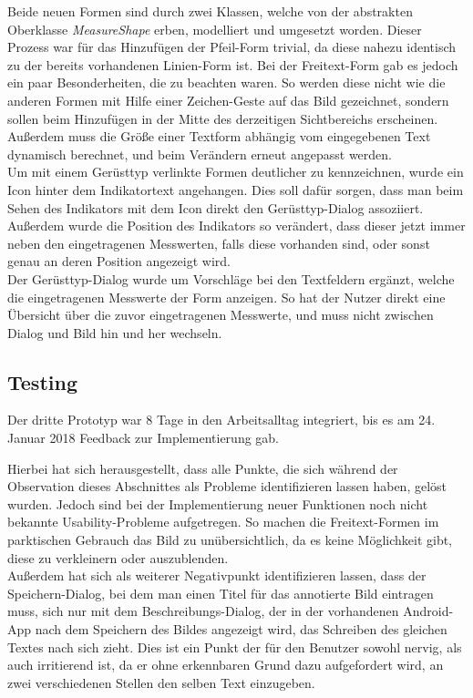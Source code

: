 Beide neuen Formen sind durch zwei Klassen, welche von der abstrakten Oberklasse \emph{MeasureShape} erben, modelliert und umgesetzt worden.
Dieser Prozess war für das Hinzufügen der Pfeil-Form trivial, da diese nahezu identisch zu der bereits vorhandenen Linien-Form ist.
Bei der Freitext-Form gab es jedoch ein paar Besonderheiten, die zu beachten waren.
So werden diese nicht wie die anderen Formen mit Hilfe einer Zeichen-Geste auf das Bild gezeichnet, sondern sollen beim Hinzufügen in der Mitte des derzeitigen Sichtbereichs erscheinen.
Außerdem muss die Größe einer Textform abhängig vom eingegebenen Text dynamisch berechnet, und beim Verändern erneut angepasst werden. \\

Um mit einem Gerüsttyp verlinkte Formen deutlicher zu kennzeichnen, wurde ein Icon  hinter dem Indikatortext angehangen.
Dies soll dafür sorgen, dass man beim Sehen des Indikators mit dem Icon direkt den Gerüsttyp-Dialog assoziiert.
Außerdem wurde die Position des Indikators so verändert, dass dieser jetzt immer neben den eingetragenen Messwerten, falls diese vorhanden sind, oder sonst genau an deren Position angezeigt wird. \\

Der Gerüsttyp-Dialog wurde um Vorschläge bei den Textfeldern ergänzt, welche die eingetragenen Messwerte der Form anzeigen.
So hat der Nutzer direkt eine Übersicht über die zuvor eingetragenen Messwerte, und muss nicht zwischen Dialog und Bild hin und her wechseln. \\

\subsection{Testing}
Der dritte Prototyp war 8 Tage in den Arbeitsalltag integriert, bis es am 24. Januar 2018 Feedback zur Implementierung gab.

Hierbei hat sich herausgestellt, dass alle Punkte, die sich während der Observation dieses Abschnittes als Probleme identifizieren lassen haben, gelöst wurden.
Jedoch sind bei der Implementierung neuer Funktionen noch nicht bekannte Usability-Probleme aufgetregen.
So machen die Freitext-Formen im parktischen Gebrauch das Bild zu unübersichtlich, da es keine Möglichkeit gibt, diese zu verkleinern oder auszublenden. \\

Außerdem hat sich als weiterer Negativpunkt identifizieren lassen, dass der Speichern-Dialog, bei dem man einen Titel für das annotierte Bild eintragen muss, sich nur mit dem Beschreibungs-Dialog, der in der vorhandenen Android-App nach dem Speichern des Bildes angezeigt wird, das Schreiben des gleichen Textes nach sich zieht.
Dies ist ein Punkt der für den Benutzer sowohl nervig, als auch irritierend ist, da er ohne erkennbaren Grund dazu aufgefordert wird, an zwei verschiedenen Stellen den selben Text einzugeben. \\


